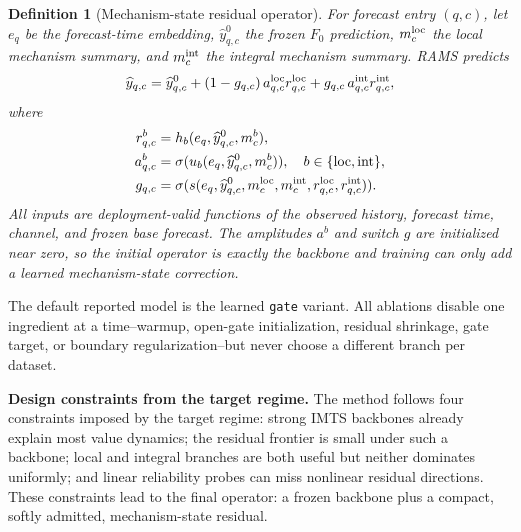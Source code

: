 ﻿\documentclass[10pt,conference]{IEEEtran}
\newtheorem{definition}{Definition}
\newcommand{\method}{\textnormal{\mbox{RAMS}}}
\begin{document}
\begin{definition}[Mechanism-state residual operator]
For forecast entry \((q,c)\), let \(e_q\) be the forecast-time embedding,
\(\widehat y^0_{q,c}\) the frozen \(F_0\) prediction, \(m^{\rm loc}_c\) the
local mechanism summary, and \(m^{\rm int}_c\) the integral mechanism summary.
\method{} predicts
\begin{equation}
\widehat y_{q,c}
=\widehat y^0_{q,c}
+(1-g_{q,c})\,a^{\rm loc}_{q,c}r^{\rm loc}_{q,c}
+g_{q,c}\,a^{\rm int}_{q,c}r^{\rm int}_{q,c},
\end{equation}
where
\[
\begin{aligned}
r^{b}_{q,c} &= h_b(e_q,\widehat y^0_{q,c},m^b_c),\\
a^{b}_{q,c} &= \sigma(u_b(e_q,\widehat y^0_{q,c},m^b_c)),\quad b\in
\{\mathrm{loc},\mathrm{int}\},\\
g_{q,c} &= \sigma(s(e_q,\widehat y^0_{q,c},m^{\rm loc}_c,m^{\rm int}_c,
r^{\rm loc}_{q,c},r^{\rm int}_{q,c})).
\end{aligned}
\]
All inputs are deployment-valid functions of the observed history, forecast
time, channel, and frozen base forecast.  The amplitudes \(a^b\) and switch
\(g\) are initialized near zero, so the initial operator is exactly the
backbone and training can only add a learned mechanism-state correction.
\end{definition}

The default reported model is the learned \texttt{gate} variant.  All
ablations disable one ingredient at a time--warmup, open-gate initialization,
residual shrinkage, gate target, or boundary regularization--but never choose a
different branch per dataset.

\textbf{Design constraints from the target regime.}
The method follows four constraints imposed by the target regime:
strong IMTS backbones already explain most value dynamics; the residual
frontier is small under such a backbone; local and integral branches are both
useful but neither dominates uniformly; and linear reliability probes can miss
nonlinear residual directions.  These constraints lead to the final operator:
a frozen backbone plus a compact, softly admitted, mechanism-state residual.
\end{document}
